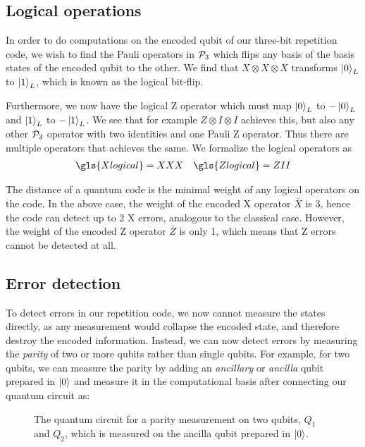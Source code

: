 \subsection{Logical operations}

In order to do computations on the encoded qubit of our three-bit repetition code, we wish to find the Pauli operators in $\mathcal{P}_3$ which flips any basis of the basis states of the encoded qubit to the other. We find that $X\otimes X\otimes X$ transforms $\ket{0}_L$ to $\ket{1}_L$, which is known as the logical bit-flip.

Furthermore, we now have the logical Z operator which must map $\ket{0}_L$ to $-\ket{0}_L$ and $\ket{1}_L$ to $-\ket{1}_L$. We see that for example $Z\otimes I\otimes I$ achieves this, but also any other $\mathcal{P}_3$ operator with two identities and one Pauli Z operator. Thus there are multiple operators that achieves the same. We formalize the logical operators as
\begin{align}\label{eq:qec_3bitlogical}
  \gls{Xlogical} = XXX && \gls{Zlogical} = ZII
\end{align}

The distance of a quantum code is the minimal weight of any logical operators on the code. In the above case, the weight of the encoded X operator $\bar{X}$ is 3, hence the code can detect up to 2 X errors, analogous to the classical case. However, the weight of the encoded Z operator $\bar{Z}$ is only 1, which means that Z errors cannot be detected at all.

\subsection{Error detection}

To detect errors in our repetition code, we now cannot measure the states directly, as any measurement would collapse the encoded state, and therefore destroy the encoded information. Instead, we can now detect errors by measuring the \emph{parity} of two or more qubits rather than single qubits. For example, for two qubits, we can measure the parity by adding an \emph{ancillary} or \emph{ancilla} qubit prepared in $\ket{0}$ and measure it in the computational basis after connecting our quantum circuit as:

\begin{figure}
  \centering
  \caption{The quantum circuit for a parity measurement on two qubits, $Q_1$ and $Q_2$, which is measured on the ancilla qubit prepared in $\ket{0}$. }\label{fig:2qubitparity}
\end{figure}


